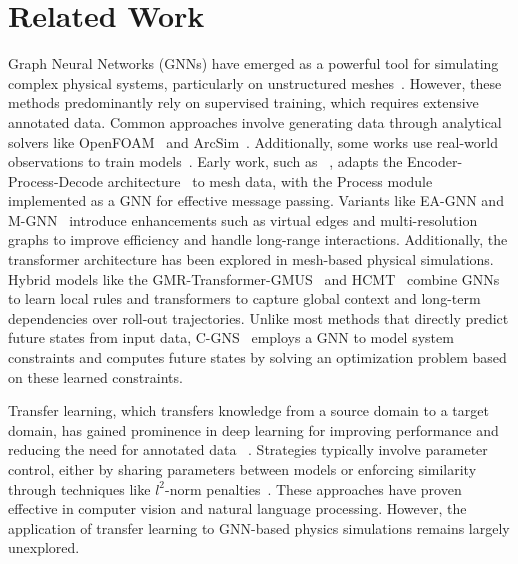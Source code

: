\section{Related Work}
\label{related_work}

Graph Neural Networks (GNNs) have emerged as a powerful tool for simulating complex physical systems, particularly on unstructured meshes~\cite{meshgraphnets, GraphNetworkDiscontinuous, GraphNetworkConstraint, allen2022FIG, allen2022physical}. 
However, these methods predominantly rely on supervised training, which requires extensive annotated data. Common approaches involve generating data through analytical solvers like OpenFOAM~\cite{OpenFOAM} and ArcSim~\cite{arcsim}. Additionally, some works use real-world observations to train models~\cite{particle-based-RGB, allen2022FIG}.
Early work, such as \MGN ~\cite{meshgraphnets}, adapts the Encoder-Process-Decode architecture~\cite{GNS} to mesh data, with the Process module implemented as a GNN for effective message passing. 
Variants like EA-GNN and M-GNN~\cite{gnnunet} introduce enhancements such as virtual edges and multi-resolution graphs to improve efficiency and handle long-range interactions. 
Additionally, the transformer architecture has been explored in mesh-based physical simulations. Hybrid models like the GMR-Transformer-GMUS~\cite{TemporalAttention} and HCMT~\cite{HCMT} combine GNNs to learn local rules and transformers to capture global context and long-term dependencies over roll-out trajectories. 
Unlike most methods that directly predict future states from input data, C-GNS~\cite{GraphNetworkConstraint} employs a GNN to model system constraints and computes future states by solving an optimization problem based on these learned constraints. 

Transfer learning, which transfers knowledge from a source domain to a target domain, has gained prominence in deep learning for improving performance and reducing the need for annotated data ~\cite{TLResNet1, TLResNet2, GPT3, llama}.
Strategies typically involve parameter control, either by sharing parameters between models or enforcing similarity through techniques like $l^2$-norm penalties~\cite{TLsurvey, gouk2020distance, xuhong2018explicit}.
These approaches have proven effective in computer vision and natural language processing. However, the application of transfer learning to GNN-based physics simulations remains largely unexplored.